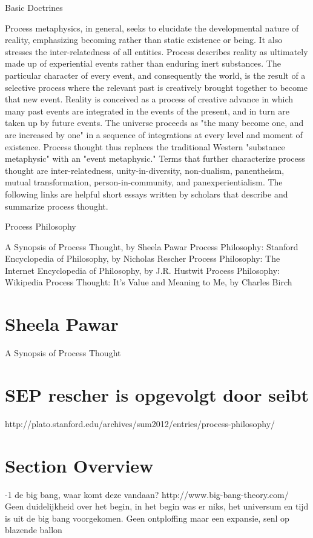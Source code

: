 \documentclass[a4paper]{Thesis}
\begin{document}
Basic Doctrines

Process metaphysics, in general, seeks to elucidate the developmental nature of reality, emphasizing becoming rather than static existence or being. It also stresses the inter-relatedness of all entities. Process describes reality as ultimately made up of experiential events rather than enduring inert substances. The particular character of every event, and consequently the world, is the result of a selective process where the relevant past is creatively brought together to become that new event. Reality is conceived as a process of creative advance in which many past events are integrated in the events of the present, and in turn are taken up by future events. The universe proceeds as "the many become one, and are increased by one" in a sequence of integrations at every level and moment of existence. Process thought thus replaces the traditional Western "substance metaphysic" with an "event metaphysic." Terms that further characterize process thought are inter-relatedness, unity-in-diversity, non-dualism, panentheism, mutual transformation, person-in-community, and panexperientialism. The following links are helpful short essays written by scholars that describe and summarize process thought.

Process Philosophy

A Synopsis of Process Thought, by Sheela Pawar
Process Philosophy: Stanford Encyclopedia of Philosophy, by Nicholas Rescher
Process Philosophy: The Internet Encyclopedia of Philosophy, by J.R. Hustwit
Process Philosophy: Wikipedia
Process Thought: It's Value and Meaning to Me, by Charles Birch


\section{Sheela Pawar}
A Synopsis of Process Thought


\section{SEP rescher is opgevolgt door seibt}
http://plato.stanford.edu/archives/sum2012/entries/process-philosophy/

\section{Section Overview}

-1 de big bang, waar komt deze vandaan?
http://www.big-bang-theory.com/
Geen duidelijkheid over het begin, in het begin was er niks, het universum en tijd is uit de big bang voorgekomen.
Geen ontploffing maar een expansie, senl op blazende ballon
\end{document}
